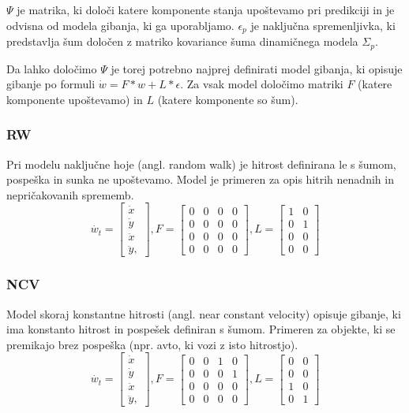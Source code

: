 \documentclass[a4paper]{article}
\begin{document}
$\Psi$ je matrika, ki določi katere komponente stanja upoštevamo pri predikciji in je odvisna od modela gibanja, ki ga uporabljamo. $\epsilon_p$ je naključna spremenljivka, ki predstavlja šum določen z matriko kovariance šuma dinamičnega modela $\Sigma_p$.

Da lahko določimo $\Psi$ je torej potrebno najprej definirati model gibanja, ki opisuje gibanje po formuli $\dot{w}=F*w+L* \epsilon$. Za vsak model določimo matriki $F$ (katere komponente upoštevamo) in $L$ (katere komponente so šum).

\subsubsection{RW}
Pri modelu naključne hoje (angl. random walk) je hitrost definirana le s šumom, pospeška in sunka ne upoštevamo. Model je primeren za opis hitrih nenadnih in nepričakovanih sprememb.
$$
\dot{w_t}=
\begin{bmatrix}
	\dot{x}\\\dot{y}\\\ddot{x}\\\ddot{y},
\end{bmatrix}
,F = \begin{bmatrix}
	0&0&0&0\\0&0&0&0\\0&0&0&0\\0&0&0&0
\end{bmatrix}
,L = \begin{bmatrix}
	1&0\\0&1\\0&0\\0&0
\end{bmatrix}
$$

\subsubsection{NCV}
Model skoraj konstantne hitrosti (angl. near constant velocity) opisuje gibanje, ki ima konstanto hitrost in pospešek definiran s šumom. Primeren za objekte, ki se premikajo brez pospeška (npr. avto, ki vozi z isto hitrostjo).
$$
\dot{w_t}=
\begin{bmatrix}
	\dot{x}\\\dot{y}\\\ddot{x}\\\ddot{y},
\end{bmatrix}
,F = \begin{bmatrix}
	0&0&1&0\\0&0&0&1\\0&0&0&0\\0&0&0&0
\end{bmatrix}
,L = \begin{bmatrix}
	0&0\\0&0\\1&0\\0&1
\end{bmatrix}
$$
\end{document}

